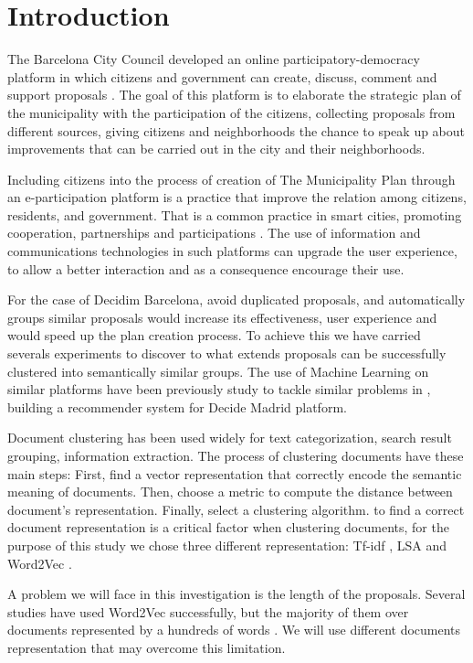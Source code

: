 \normallinespacing

\chapter{Introduction}
The Barcelona City Council developed an online participatory-democracy platform in which citizens and government can create, discuss, comment and support proposals \cite{decidim}. The goal of this platform is to elaborate the strategic plan of the municipality with the participation of the citizens, collecting proposals from different sources, giving citizens and neighborhoods the chance to speak up about improvements that can be carried out in the city and their neighborhoods.

Including citizens into the process of creation of The Municipality Plan through an e-participation platform is a practice that improve the relation among citizens, residents, and government. That is a common practice in smart cities, promoting cooperation, partnerships and participations \cite{decide.madrid}. The use of information and communications technologies in such platforms can upgrade the user experience, to allow a better interaction and as a consequence encourage their use.

For the case of Decidim Barcelona, avoid duplicated proposals, and automatically groups similar proposals would increase its effectiveness, user experience and would speed up the plan creation process. To achieve this we have carried severals experiments to discover to what extends proposals can be successfully clustered into semantically similar groups. The use of Machine Learning on similar platforms have been previously study to tackle similar problems in \cite{decide.madrid}, building a recommender system for Decide Madrid platform.  

Document clustering has been used widely for text categorization, search result grouping, information extraction. The process of clustering documents have these main steps: First, find a vector representation that correctly encode the semantic meaning of documents. Then, choose a metric to compute the distance between document's representation. Finally, select a clustering algorithm. to find a correct document representation is a critical factor when clustering documents, for the purpose of this study we chose three different representation: Tf-idf \cite{tfidf}, LSA \cite{lsa} and Word2Vec \cite{mikolov2013}.  

A problem we will face in this investigation is the length of the proposals. Several studies have used Word2Vec successfully, but the majority of them over documents represented by a hundreds of words \cite{clust.short.text}. We will use different documents representation that may overcome this limitation.


